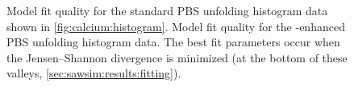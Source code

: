 \begin{figure}
  \begin{center}
    \caption{\protect{} Model fit quality
      for the standard PBS unfolding histogram data shown in
      \cref{fig:calcium:histogram}.
      \protect{} Model fit
      quality for the \Ca-enhanced PBS unfolding histogram data.  The
      best fit parameters occur when the Jensen--Shannon divergence is
      minimized (at the bottom of these valleys,
      \cref{sec:sawsim:results:fitting}).\label{fig:calcium:valley}}
  \end{center}
\end{figure}
